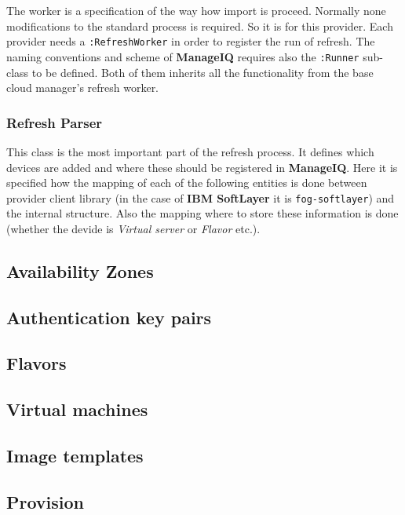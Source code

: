 The worker is a specification of the way how import is proceed. Normally none modifications to the standard process is required. So it is for this provider. Each provider needs a \texttt{:RefreshWorker} in order to register the run of refresh. The naming conventions and scheme of \textbf{ManageIQ} requires also the \texttt{:Runner} sub-class to be defined. Both of them inherits all the functionality from the base cloud manager's refresh worker.

\subsubsection{Refresh Parser}
\label{subs:Refresh Parser}

This class is the most important part of the refresh process. It defines which devices are added and where these should be registered in \textbf{ManageIQ}. Here it is specified how the mapping of each of the following entities is done between provider client library (in the case of \textbf{IBM SoftLayer} it is \texttt{fog-softlayer}) and the internal structure. Also the mapping where to store these information is done (whether the devide is \emph{Virtual server} or \emph{Flavor} etc.).

\subsection{Availability Zones}
\label{sub:Availability Zones}

\subsection{Authentication key pairs}
\label{sub:Authentication key pairs}

\subsection{Flavors}
\label{sub:Flavors}

\subsection{Virtual machines}
\label{sub:Virtual machines}

\subsection{Image templates}
\label{sub:Image templates}

\subsection{Provision}
\label{sub:Provision}

